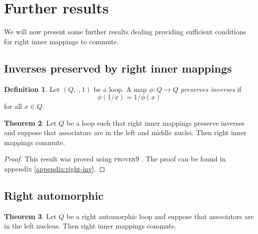 \documentclass[12pt]{report}
\theoremstyle{definition}
\newtheorem{thm}{Theorem}[chapter]
\newtheorem{dfn}[thm]{Definition}
\newcommand{\rdv}{/}                %
\begin{document}
\section{Further results}

We will now present some further results dealing providing sufficient conditions for right
  inner mappings to commute.

\subsection{Inverses preserved by right inner mappings}

\begin{dfn}
  Let $(Q, \cdot, 1)$ be a loop. A map $\phi: Q\to Q$ \emph{preserves inverses} if
  \[\phi(1\rdv x) = 1\rdv \phi(x)\]
  for all $x\in Q$.
\end{dfn}

\begin{thm}\label{thm:right-inv}
  Let $Q$ be a loop such that right inner mappings preserve inverses and suppose that
    associators are in the left and middle nuclei. Then right inner mappings commute.
\end{thm}

\begin{proof}
  This result was proved using \textsc{prover9} \cite{Prover9}. The proof can be found in
    appendix \ref{appendix:right-inv}.
\end{proof}

\subsection{Right automorphic}

\begin{thm}\label{right-aut}
  Let $Q$ be a right automorphic loop and suppose that associators are in the left nucleus.
    Then right inner mappings commute.
\end{thm}
\end{document}
